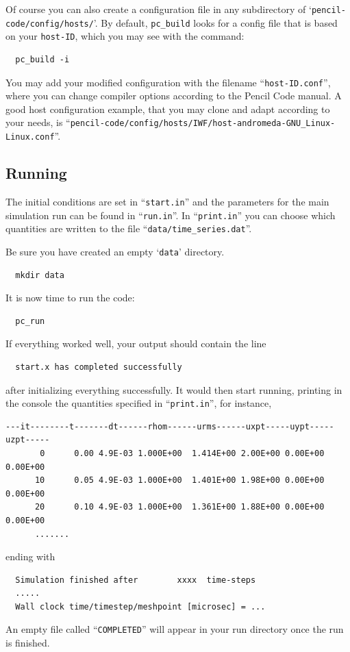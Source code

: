 \documentclass[a4paper,12pt]{article}
\newcommand{\command}[1]{\texttt{#1}}
\newcommand{\file}[1]{``\texttt{#1}''}
\newcommand{\directory}[1]{`\texttt{#1}'}
\newcommand{\code}[1]{\texttt{#1}}
\begin{document}
Of course you can also create a configuration file in any subdirectory of \directory{pencil-code/config/hosts/}.
By default, \command{pc\_build} looks for a config file that is based on your \code{host-ID}, which you may see with the command:
\begin{verbatim}
  pc_build -i
\end{verbatim}
You may add your modified configuration with the filename \file{host-ID.conf}, where you can change compiler options according to the Pencil Code manual.
A good host configuration example, that you may clone and adapt according to your needs, is \file{pencil-code/config/hosts/IWF/host-andromeda-GNU\_Linux-Linux.conf}.

\subsection{Running}

The initial conditions are set in \file{start.in} and the parameters for the main simulation run can be found in \file{run.in}.
In \file{print.in} you can choose which quantities are written to the file \file{data/time\_series.dat}.

Be sure you have created an empty \directory{data} directory.
\begin{verbatim}
  mkdir data
\end{verbatim}

It is now time to run the code:
\begin{verbatim}
  pc_run
\end{verbatim}
If everything worked well, your output should contain the line
\begin{verbatim}
  start.x has completed successfully
\end{verbatim}
after initializing everything successfully. It would then start running,   
printing in the console the quantities specified in \file{print.in}, for 
instance,
\begin{verbatim}
---it--------t-------dt------rhom------urms------uxpt-----uypt-----uzpt-----
       0      0.00 4.9E-03 1.000E+00  1.414E+00 2.00E+00 0.00E+00 0.00E+00
      10      0.05 4.9E-03 1.000E+00  1.401E+00 1.98E+00 0.00E+00 0.00E+00
      20      0.10 4.9E-03 1.000E+00  1.361E+00 1.88E+00 0.00E+00 0.00E+00 
      .......
\end{verbatim}
ending with
\begin{verbatim}
  Simulation finished after        xxxx  time-steps
  .....
  Wall clock time/timestep/meshpoint [microsec] = ...
\end{verbatim}
An empty file called \file{COMPLETED} will appear in your run directory once 
the run is finished.
\end{document}
